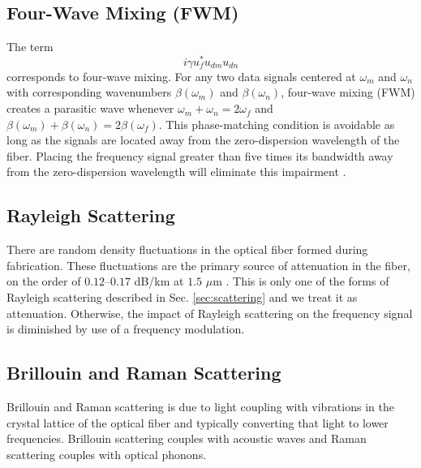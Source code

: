 \subsection{Four-Wave Mixing (FWM)}

The term
%
\begin{equation}
i\gamma u_f^*u_{dm}u_{dn}
\end{equation}
%
corresponds to four-wave mixing. For any two data signals centered at $\omega_m$ and $\omega_n$ with corresponding wavenumbers $\beta(\omega_m)$ and $\beta(\omega_n)$, four-wave mixing (FWM) creates a parasitic wave whenever $\omega_m + \omega_n = 2\omega_f$ and $\beta(\omega_m) + \beta(\omega_n) = 2\beta(\omega_f)$. This phase-matching condition is avoidable as long as the signals are located away from the zero-dispersion wavelength of the fiber. Placing the frequency signal greater than five times its bandwidth away from the zero-dispersion wavelength will eliminate this impairment \cite{menyukIFCS2015}.

\subsection{Rayleigh Scattering}

There are random density fluctuations in the optical fiber formed during fabrication. These fluctuations are the primary source of attenuation in the fiber, on the order of $0.12$--$0.17$ dB/km at $1.5$ $\mu$m \cite{agrawal2012fiber}. This is only one of the forms of Rayleigh scattering described in Sec. \ref{sec:scattering} and we treat it as attenuation. Otherwise, the impact of Rayleigh scattering on the frequency signal is diminished by use of a frequency modulation.

\subsection{Brillouin and Raman Scattering}

Brillouin and Raman scattering is due to light coupling with vibrations in the crystal lattice of the optical fiber and typically converting that light to lower frequencies. Brillouin scattering couples with acoustic waves and Raman scattering couples with optical phonons.

